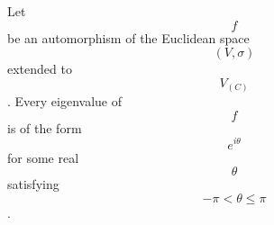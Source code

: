 Let $$f$$ be an automorphism of the Euclidean space $$(V, \sigma)$$ extended to $$V_{(C)}$$. Every eigenvalue of $$f$$ is of the form $$e^{i\theta}$$ for some real $$\theta$$ satisfying $$-\pi < \theta \leq \pi$$.
